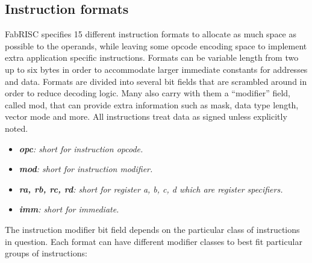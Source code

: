         \subsection{Instruction formats}

            \vspace{10pt}

            FabRISC specifies 15 different instruction formats to allocate as much space as possible to the operands, while leaving some opcode encoding space to implement extra application specific instructions. Formats can be variable length from two up to six bytes in order to accommodate larger immediate constants for addresses and data. Formats are divided into several bit fields that are scrambled around in order to reduce decoding logic. Many also carry with them a ``modifier'' field, called mod, that can provide extra information such as mask, data type length, vector mode and more. All instructions treat data as signed unless explicitly noted.

            \vspace{10pt}
            
            \vspace{10pt}

            \begin{itemize}

                \item \textit{\textbf{opc}: short for instruction opcode.}
                \item \textit{\textbf{mod}: short for instruction modifier.}
                \item \textit{\textbf{ra, rb, rc, rd}: short for register a, b, c, d which are register specifiers.}
                \item \textit{\textbf{imm}: short for immediate.}

            \end{itemize}

            The instruction modifier bit field depends on the particular class of instructions in question. Each format can have different modifier classes to best fit particular groups of instructions:

